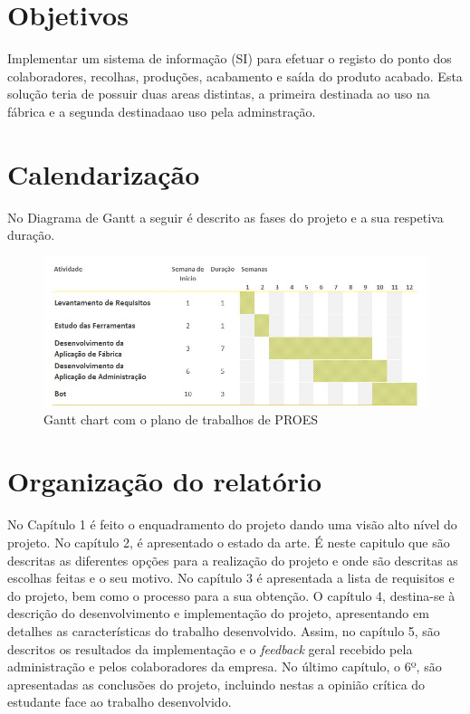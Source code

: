 \section{Objetivos}
Implementar um sistema de informação (SI\label{sym:SI}) para efetuar o registo do ponto dos colaboradores, recolhas, produções, acabamento e saída do produto acabado. Esta solução teria de possuir duas areas distintas, a primeira destinada ao uso na fábrica e a segunda destinadaao uso pela adminstração.

\section{Calendarização}
No Diagrama de Gantt a seguir é descrito as fases do projeto e a sua respetiva duração.

\begin{figure}[htbp] 
    \begin{center}
    \includegraphics[width=\textwidth,keepaspectratio]{figuras/DiagramaGant.jpg}
    \caption{Gantt chart com o plano de trabalhos de PROES\label{sym:PROES}}\label{fig:gantt chart} 
    \end{center}
\end{figure}

\section{Organização do relatório}
No Capítulo 1 é feito o enquadramento do projeto dando uma visão alto nível do projeto. No capítulo 2, é apresentado o estado da arte. É neste capitulo que são descritas as diferentes opções para a realização do projeto e onde são descritas as escolhas feitas e o seu motivo. No capítulo 3 é apresentada a lista de requisitos e do projeto, bem como o processo para a sua obtenção. O capítulo 4, destina-se à descrição do desenvolvimento e implementação do projeto, apresentando em detalhes as características do trabalho desenvolvido.
Assim, no capítulo 5, são descritos os resultados da implementação e o \textit{feedback} geral recebido pela administração e pelos colaboradores da empresa. No último capítulo, o 6º, são apresentadas as conclusões do projeto, incluindo nestas a opinião crítica do estudante face ao trabalho desenvolvido.
